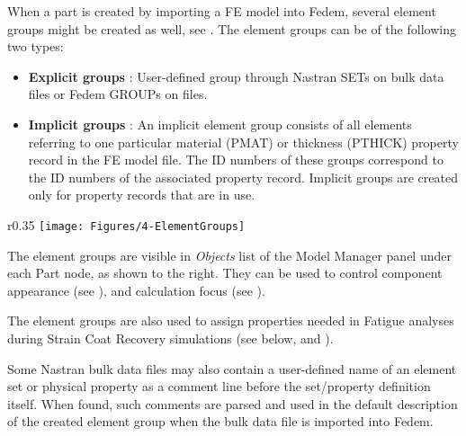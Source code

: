 \clearpage





When a part is created by importing a FE model into Fedem,
several element groups might be created as well, see
.
The element groups can be of the following two types:

\begin{itemize}
\item
  \textbf{Explicit groups} : User-defined group through Nastran SETs on
  bulk data files or Fedem GROUPs on  files.
\item
  \textbf{Implicit groups} : An implicit element group consists of all
  elements referring to one particular material (PMAT) or thickness
  (PTHICK) property record in the FE model file. The ID numbers of these
  groups correspond to the ID numbers of the associated property record.
  Implicit groups are created only for property records that are in use.
\end{itemize}


\begin{wrapfigure}[12]{r}{0.35\textwidth}
  \texttt{[image: Figures/4-ElementGroups]}
\end{wrapfigure}

The element groups are visible in {\sl Objects} list of the Model Manager panel
under each Part node, as shown to the right.
They can be used to control component appearance (see
),
and calculation focus (see
).

The element groups are also used to assign properties needed in Fatigue
analyses during Strain Coat Recovery simulations (see
 below, and
).

Some Nastran bulk data files may also contain a user-defined name of an
element set or physical property as a comment line before the
set/property definition itself. When found, such comments are parsed and
used in the default description of the created element group when
the bulk data file is imported into Fedem.

